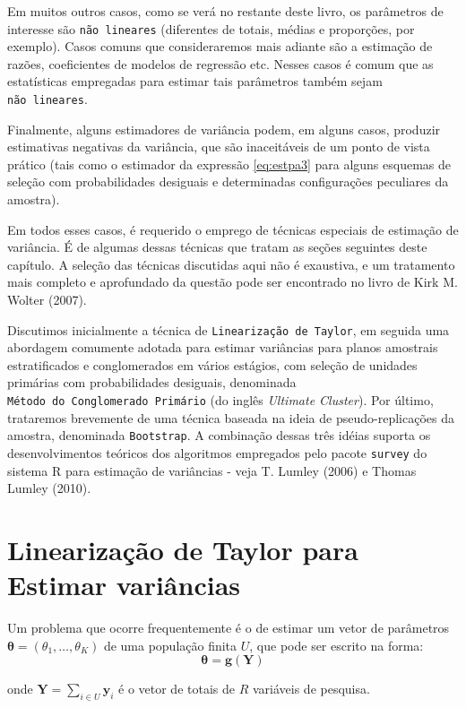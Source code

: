 \documentclass[
  12pt,
  brazilian,
]{book}
\theoremstyle{definition}
\theoremstyle{definition}
\theoremstyle{definition}
\theoremstyle{definition}
\theoremstyle{remark}
\begin{document}
Em muitos outros casos, como se verá no restante deste livro, os parâmetros de interesse são \texttt{não\ lineares} (diferentes de totais, médias e proporções, por exemplo). Casos comuns que consideraremos mais adiante são a estimação de razões,
coeficientes de modelos de regressão etc. Nesses casos é comum que as estatísticas empregadas para estimar tais parâmetros também sejam \texttt{não\ lineares}.

Finalmente, alguns estimadores de variância podem, em alguns casos, produzir estimativas negativas da variância, que são inaceitáveis de um ponto de vista prático (tais como o estimador da expressão \eqref{eq:estpa3} para alguns esquemas de seleção com probabilidades desiguais e determinadas configurações peculiares da
amostra).

Em todos esses casos, é requerido o emprego de técnicas especiais de estimação de variância. É de algumas dessas técnicas que tratam as seções seguintes deste capítulo. A seleção das técnicas discutidas aqui não é exaustiva, e um tratamento
mais completo e aprofundado da questão pode ser encontrado no livro de Kirk M. Wolter (2007).

Discutimos inicialmente a técnica de \texttt{Linearização\ de\ Taylor}, em seguida uma abordagem comumente adotada para estimar variâncias para planos amostrais estratificados e conglomerados em vários estágios, com seleção de unidades primárias com probabilidades desiguais, denominada \texttt{Método\ do\ Conglomerado\ Primário} (do inglês \emph{Ultimate Cluster}). Por último, trataremos brevemente de uma técnica baseada na ideia de pseudo-replicações da amostra, denominada \texttt{Bootstrap}. A combinação dessas três idéias suporta os desenvolvimentos teóricos dos algoritmos empregados pelo pacote \texttt{survey} do sistema R para estimação de variâncias - veja T. Lumley (2006) e Thomas Lumley (2010).

\hypertarget{taylor}{%
\section{Linearização de Taylor para Estimar variâncias}\label{taylor}}

Um problema que ocorre frequentemente é o de estimar um vetor de parâmetros
\(\mathbf{\theta} = \left( \theta _{1},\ldots ,\theta_{K}\right)\) de uma população finita \(U\), que pode ser escrito na forma:
\[
\mathbf{\theta} = \mathbf{g}(\mathbf{Y}) 
\]

onde \(\mathbf{Y} = \sum_{i \in U} \mathbf{y}_i\) é o vetor de totais de \(R\) variáveis de pesquisa.
\end{document}
